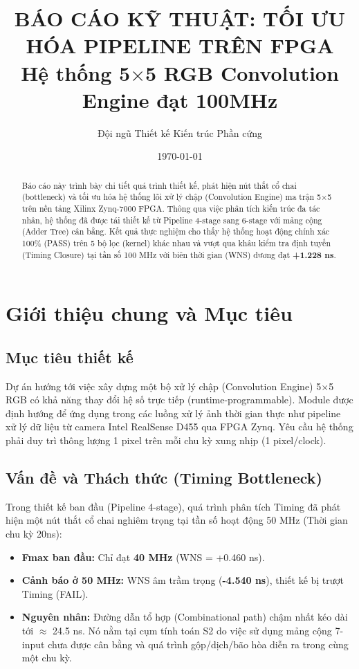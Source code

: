 \documentclass[a4paper,12pt]{article}
\title{\textbf{BÁO CÁO KỸ THUẬT: TỐI ƯU HÓA PIPELINE TRÊN FPGA}\\
\large Hệ thống 5$\times$5 RGB Convolution Engine đạt 100MHz}
\author{Đội ngũ Thiết kế Kiến trúc Phần cứng}
\date{\today}
\begin{document}
\maketitle

\begin{abstract}
Báo cáo này trình bày chi tiết quá trình thiết kế, phát hiện nút thắt cổ chai (bottleneck) và tối ưu hóa hệ thống lõi xử lý chập (Convolution Engine) ma trận 5$\times$5 trên nền tảng Xilinx Zynq-7000 FPGA. Thông qua việc phân tích kiến trúc đa tác nhân, hệ thống đã được tái thiết kế từ Pipeline 4-stage sang 6-stage với mảng cộng (Adder Tree) cân bằng. Kết quả thực nghiệm cho thấy hệ thống hoạt động chính xác 100\% (PASS) trên 5 bộ lọc (kernel) khác nhau và vượt qua khâu kiểm tra định tuyến (Timing Closure) tại tần số 100 MHz với biên thời gian (WNS) dương đạt \textbf{+1.228 ns}.
\end{abstract}

\tableofcontents
\newpage

\section{Giới thiệu chung và Mục tiêu}
\subsection{Mục tiêu thiết kế}
Dự án hướng tới việc xây dựng một bộ xử lý chập (Convolution Engine) 5$\times$5 RGB có khả năng thay đổi hệ số trực tiếp (runtime-programmable). Module được định hướng để ứng dụng trong các luồng xử lý ảnh thời gian thực như pipeline xử lý dữ liệu từ camera Intel RealSense D455 qua FPGA Zynq. Yêu cầu hệ thống phải duy trì thông lượng 1 pixel trên mỗi chu kỳ xung nhịp (1 pixel/clock).

\subsection{Vấn đề và Thách thức (Timing Bottleneck)}
Trong thiết kế ban đầu (Pipeline 4-stage), quá trình phân tích Timing đã phát hiện một nút thắt cổ chai nghiêm trọng tại tần số hoạt động 50 MHz (Thời gian chu kỳ 20ns):
\begin{itemize}
    \item \textbf{Fmax ban đầu:} Chỉ đạt \textbf{40 MHz} (WNS = +0.460 ns).
    \item \textbf{Cảnh báo ở 50 MHz:} WNS âm trầm trọng (\textbf{-4.540 ns}), thiết kế bị trượt Timing (FAIL).
    \item \textbf{Nguyên nhân:} Đường dẫn tổ hợp (Combinational path) chậm nhất kéo dài tới $\approx$ 24.5 ns. Nó nằm tại cụm tính toán S2 do việc sử dụng mảng cộng 7-input chưa được cân bằng và quá trình gộp/dịch/bão hòa diễn ra trong cùng một chu kỳ.
\end{itemize}
\end{document}
